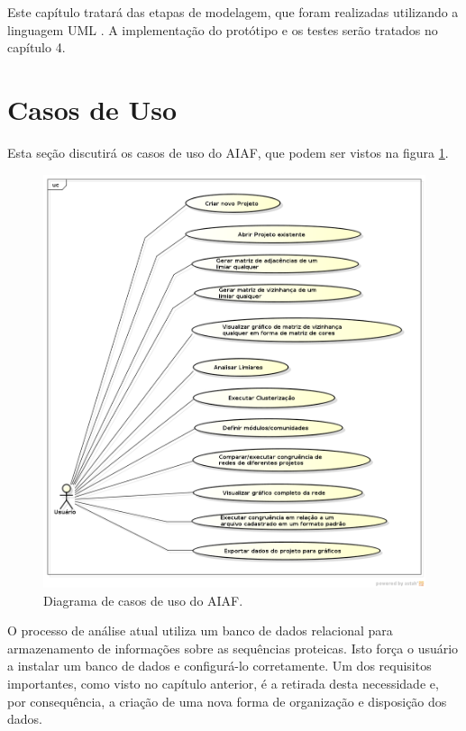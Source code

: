Este capítulo tratará das etapas de modelagem, que foram realizadas utilizando a linguagem UML \cite{uml}. A implementação do protótipo e os testes serão
tratados no capítulo 4.

\section{Casos de Uso} \label{sec:escopo}

Esta seção discutirá os casos de uso do AIAF, que podem ser vistos na figura \ref{fig:casos-uso}.

\begin{figure}
\centering
\includegraphics[scale=0.52]{diagrama-casos-de-uso}
\caption{Diagrama de casos de uso do AIAF.}
\label{fig:casos-uso}
\end{figure}

O processo de análise atual utiliza um banco de dados relacional para armazenamento de informações
sobre as sequências proteicas. Isto força o usuário a instalar
um banco de dados e configurá-lo corretamente. Um dos requisitos importantes, como visto no capítulo anterior, é a retirada desta necessidade e,
por consequência, a criação de uma nova forma de organização e disposição dos dados.

